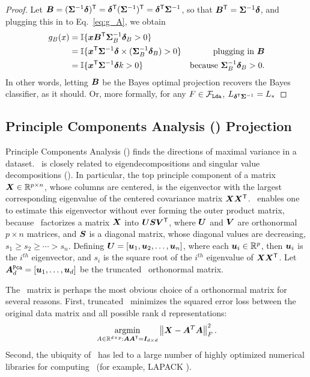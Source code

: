 \documentclass[10pt]{article}
\begin{document}
\begin{proof}
Let $\boldsymbol{B} = (\boldsymbol{\Sigma}^{-1} \boldsymbol{\delta})^{\mathsf{T}} = \boldsymbol{\delta}^{\mathsf{T}} (\boldsymbol{\Sigma}^{-1})^{\mathsf{T}} = \boldsymbol{\delta}^{\mathsf{T}} \boldsymbol{\Sigma}^{-1}$, so that $\boldsymbol{B}^{\mathsf{T}} = \boldsymbol{\Sigma}^{-1} \boldsymbol{\delta}$,
and plugging this in to Eq.~\eqref{eq:g_A}, we obtain
\begin{align*}
g_{B}(x) &= \mathbb{I} \{ \boldsymbol{x} \boldsymbol{B}^{\mathsf{T}}  \boldsymbol{\Sigma}^{-1}_{B} \boldsymbol{\delta}_{B} > 0\} &
\\&= \mathbb{I} \{ \boldsymbol{x}^{\mathsf{T}} \boldsymbol{\Sigma}^{-1} \boldsymbol{\delta} \times (\boldsymbol{\Sigma}^{-1}_{B} \boldsymbol{\delta}_{B}) > 0\} & \text{plugging in $\boldsymbol{B}$}
\\&= \mathbb{I} \{ \boldsymbol{x}^{\mathsf{T}} \boldsymbol{\Sigma}^{-1} \boldsymbol{\delta} k > 0\} & \text{because $\boldsymbol{\Sigma}^{-1}_{B} \boldsymbol{\delta}_{B} > 0$}.
\end{align*}
In other words, letting $\boldsymbol{B}$ be the Bayes optimal projection recovers the Bayes classifier, as it should.
Or, more formally, for any $F \in \mathcal{F}_{{\sc \texttt{Lda}}}$, $L_{\boldsymbol{\delta}^{\mathsf{T}} \boldsymbol{\Sigma}^{-1}} = L_*$
\end{proof}

\subsection[PCA]{Principle Components Analysis (\Pca) Projection}
\label{sec:pca}

Principle Components Analysis (\Pca) finds the directions of maximal variance in a dataset.  \Pca~is closely related to eigendecompositions and singular value decompositions (\Svd).  In particular, the top principle component of a matrix $\boldsymbol{X} \in \mathbb{R}^{p \times n}$, whose columns are centered, is the eigenvector with the largest corresponding eigenvalue of the centered covariance matrix $\boldsymbol{X} \boldsymbol{X}^{\mathsf{T}}$.  \Svd~enables one to estimate this eigenvector without ever forming the outer product matrix, because \Svd~factorizes a matrix $\boldsymbol{X}$ into $\boldsymbol{U} \boldsymbol{S} \boldsymbol{V}^{\mathsf{T}}$, where  $\boldsymbol{U}$ and $\boldsymbol{V}$ are orthonormal  ${p \times n}$ matrices, and $\boldsymbol{S}$ is a diagonal matrix, whose diagonal values are decreasing,  $s_1 \geq s_2 \geq \cdots > s_n$.  Defining $\boldsymbol{U} =[\boldsymbol{u}_1, \boldsymbol{u}_2, \ldots, \boldsymbol{u}_n]$, where each $\boldsymbol{u}_i \in \mathbb{R}^p$, then $\boldsymbol{u}_i$ is the $i^{th}$ eigenvector, and $s_i$ is the square root of the $i^{th}$ eigenvalue of $\boldsymbol{X} \boldsymbol{X}^{\mathsf{T}}$.  Let $\boldsymbol{A}^{{\sc \texttt{Pca}}}_d =[\boldsymbol{u}_1, \ldots , \boldsymbol{u}_d]$ be the truncated \Pca~orthonormal matrix.

The \Pca~matrix is perhaps the most obvious choice of a orthonormal matrix for several reasons.  First, truncated \Pca~minimizes the squared error loss between the original data matrix and all possible rank d representations:
\begin{align*}
\argmin_{A \in \Real^{d \times p} : \bA \bA\T = \bI_{d \times d}} \norm{ \bX - \bA^T \bA }_F^2.
\end{align*}
Second, the ubiquity of \Pca~has led to a large number of highly optimized numerical libraries for computing \Pca~(for example, LAPACK \cite{Anderson1999a}).
\end{document}
